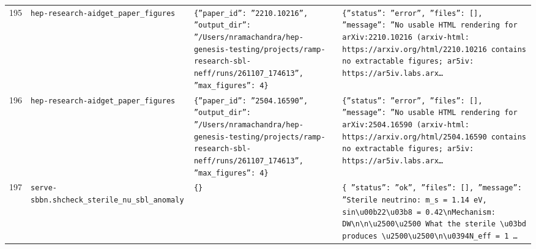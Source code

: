 \documentclass[11pt,a4paper]{article}
\begin{document}
\begin{longtable}{@{}p{}p{}p{}p{}@{}}
195 & \texttt{hep-research-aid}\newline\texttt{get\_\allowbreak{}paper\_\allowbreak{}figures} & \texttt{\{''paper\_\allowbreak{}id'':\allowbreak{} ''2210.10216'',\allowbreak{} ''output\_\allowbreak{}dir'':\allowbreak{} ''/\allowbreak{}Users/\allowbreak{}nramachandra/\allowbreak{}hep-genesis-testing/\allowbreak{}projects/\allowbreak{}ramp-research-sbl-neff/\allowbreak{}runs/\allowbreak{}261107\_\allowbreak{}174613'',\allowbreak{} ''max\_\allowbreak{}figures'':\allowbreak{} 4\}\allowbreak{}} & \texttt{\{''status'':\allowbreak{} ''error'',\allowbreak{} ''files'':\allowbreak{} []\allowbreak{},\allowbreak{} ''message'':\allowbreak{} ''No usable HTML rendering for arXiv:\allowbreak{}2210.10216 (arxiv-html:\allowbreak{} https:\allowbreak{}/\allowbreak{}/\allowbreak{}arxiv.org/\allowbreak{}html/\allowbreak{}2210.10216 contains no extractable figures;\allowbreak{} ar5iv:\allowbreak{} https:\allowbreak{}/\allowbreak{}/\allowbreak{}ar5iv.labs.arx\ldots{}\allowbreak{}} \\
196 & \texttt{hep-research-aid}\newline\texttt{get\_\allowbreak{}paper\_\allowbreak{}figures} & \texttt{\{''paper\_\allowbreak{}id'':\allowbreak{} ''2504.16590'',\allowbreak{} ''output\_\allowbreak{}dir'':\allowbreak{} ''/\allowbreak{}Users/\allowbreak{}nramachandra/\allowbreak{}hep-genesis-testing/\allowbreak{}projects/\allowbreak{}ramp-research-sbl-neff/\allowbreak{}runs/\allowbreak{}261107\_\allowbreak{}174613'',\allowbreak{} ''max\_\allowbreak{}figures'':\allowbreak{} 4\}\allowbreak{}} & \texttt{\{''status'':\allowbreak{} ''error'',\allowbreak{} ''files'':\allowbreak{} []\allowbreak{},\allowbreak{} ''message'':\allowbreak{} ''No usable HTML rendering for arXiv:\allowbreak{}2504.16590 (arxiv-html:\allowbreak{} https:\allowbreak{}/\allowbreak{}/\allowbreak{}arxiv.org/\allowbreak{}html/\allowbreak{}2504.16590 contains no extractable figures;\allowbreak{} ar5iv:\allowbreak{} https:\allowbreak{}/\allowbreak{}/\allowbreak{}ar5iv.labs.arx\ldots{}\allowbreak{}} \\
197 & \texttt{serve-sbbn.sh}\newline\texttt{check\_\allowbreak{}sterile\_\allowbreak{}nu\_\allowbreak{}sbl\_\allowbreak{}anomaly} & \texttt{\{\}\allowbreak{}} & \texttt{\{   ''status'':\allowbreak{} ''ok'',\allowbreak{}   ''files'':\allowbreak{} []\allowbreak{},\allowbreak{}   ''message'':\allowbreak{} ''Sterile neutrino:\allowbreak{} m\_\allowbreak{}s =\allowbreak{} 1.14 eV,\allowbreak{} sin\textbackslash{}\allowbreak{}u00b22\textbackslash{}\allowbreak{}u03b8 =\allowbreak{} 0.42\textbackslash{}\allowbreak{}nMechanism:\allowbreak{} DW\textbackslash{}\allowbreak{}n\textbackslash{}\allowbreak{}n\textbackslash{}\allowbreak{}u2500\textbackslash{}\allowbreak{}u2500 What the sterile \textbackslash{}\allowbreak{}u03bd produces \textbackslash{}\allowbreak{}u2500\textbackslash{}\allowbreak{}u2500\textbackslash{}\allowbreak{}n\textbackslash{}\allowbreak{}u0394N\_\allowbreak{}eff =\allowbreak{} 1 \ldots{}\allowbreak{}} \\

\end{longtable}
\end{document}
